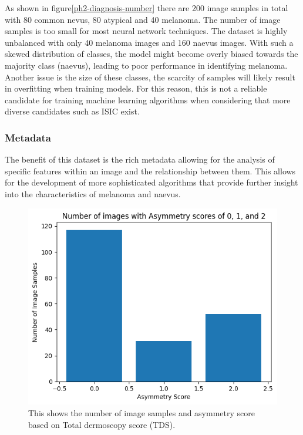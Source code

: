 As shown in figure\ref{ph2-diagnosis-number} there are 200 image samples in total with 80 common nevus, 80 atypical and 40 melanoma. The number of image samples is too small for most neural network techniques. The dataset is highly unbalanced with only 40 melanoma images and 160 naevus images. With such a skewed distribution of classes, the model might become overly biased towards the majority class (naevus), leading to poor performance in identifying melanoma. Another issue is the size of these classes, the scarcity of samples will likely result in overfitting when training models. For this reason, this is not a reliable candidate for training machine learning algorithms when considering that more diverse candidates such as ISIC exist.

\subsubsection{Metadata}
The benefit of this dataset is the rich metadata allowing for the analysis of specific features within an image and the relationship between them. This allows for the development of more sophisticated algorithms that provide further insight into the characteristics of melanoma and naevus.

\begin{figure}
	\centering
	\includegraphics[scale=0.75]{images/ph2/ph2-asym-number.png}
	\caption{This shows the number of image samples and asymmetry score based on Total dermoscopy score (TDS).}
\end{figure}\label{ph2-asym-number}

